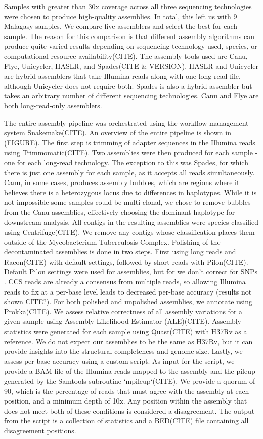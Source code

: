 \begin{markdown}
Samples with greater than 30x coverage across all three sequencing technologies were chosen to produce high-quality assemblies. In total, this left us with 9 Malagasy samples. We compare five assemblers and select the best for each sample. The reason for this comparison is that different assembly algorithms can produce quite varied results depending on sequencing technology used, species, or computational resource availability(CITE).  
The assembly tools used are Canu, Flye, Unicycler, HASLR, and Spades(CITE \& VERSION). HASLR and Unicycler are hybrid assemblers that take Illumina reads along with one long-read file, although Unicycler does not require both. Spades is also a hybrid assembler but takes an arbitrary number of different sequencing technologies. Canu and Flye are both long-read-only assemblers.

The entire assembly pipeline was orchestrated using the workflow management system Snakemake(CITE). An overview of the entire pipeline is shown in (FIGURE). The first step is trimming of adapter sequences in the Illumina reads using Trimmomatic(CITE). Two assemblies were then produced for each sample - one for each long-read technology. The exception to this was Spades, for which there is just one assembly for each sample, as it accepts all reads simultaneously. Canu, in some cases, produces assembly bubbles, which are regions where it believes there is a heterozygous locus due to differences in haplotypes. While it is not impossible some samples could be multi-clonal, we chose to remove bubbles from the Canu assemblies, effectively choosing the dominant haplotype for downstream analysis.  
All contigs in the resulting assemblies were species-classified using Centrifuge(CITE). We remove any contigs whose classification places them outside of the Mycobacterium Tuberculosis Complex.  
Polishing of the decontaminated assemblies is done in two steps. First using long reads and Racon(CITE) with default settings, followed by short reads with Pilon(CITE). Default Pilon settings were used for \ont{} assemblies, but for \pb{} we don't correct for SNPs . \pb{} CCS reads are already a consensus from multiple reads, so allowing Illumina reads to fix at a per-base level leads to decreased per-base accuracy (results not shown CITE?).  
For both polished and unpolished assemblies, we annotate using Prokka(CITE). We assess relative correctness of all assembly variations for a given sample using Assembly Likelihood Estimator (ALE)(CITE). Assembly statistics were generated for each sample using Quast(CITE) with H37Rv as a reference. We do not expect our assemblies to be the same as H37Rv, but it can provide insights into the structural completeness and genome size. Lastly, we assess per-base accuracy using a custom script. As input for the script, we provide a BAM file of the Illumina reads mapped to the assembly and the pileup generated by the Samtools subroutine `mpileup`(CITE). We provide a quorum of 90, which is the percentage of reads that must agree with the assembly at each position, and a minimum depth of 10x. Any position within the assembly that does not meet both of these conditions is considered a disagreement. The output from the script is a collection of statistics and a BED(CITE) file containing all disagreement positions.


\end{markdown}
